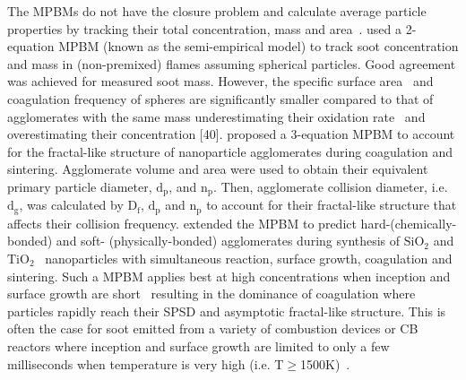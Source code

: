 The MPBMs do not have the closure problem and calculate average particle properties by tracking their total concentration, mass \citep{kruis1993simple} and area~\citep{tsantilis2004soft, lindstedt1994simplified}. \citet{kruis1993simple} used a 2-equation MPBM (known as the semi-empirical model) to track soot concentration and mass in (non-premixed) flames assuming spherical particles. Good agreement was achieved for measured soot mass. However, the specific surface area~\citep{lindstedt1994simplified} and coagulation frequency of spheres are significantly smaller compared to that of agglomerates with the same mass underestimating their oxidation rate~\citep{kelesidis2019estimating} and overestimating their concentration [40]. \citet{kruis1993simple} proposed a 3-equation MPBM to account for the fractal-like structure of nanoparticle agglomerates during coagulation and sintering. Agglomerate volume and area were used to obtain their equivalent primary particle diameter, $\mathrm{d_p}$, and $\mathrm{n_p}$. Then, agglomerate collision diameter, i.e. $\mathrm{d_g}$, was calculated by $\mathrm{D_f}$, $\mathrm{d_p}$ and $\mathrm{n_p}$ to account for their fractal-like structure that affects their collision frequency. \citet{tsantilis2004soft} extended the MPBM to predict hard-(chemically-bonded) and soft- (physically-bonded) agglomerates during synthesis of $\mathrm{SiO_2}$ and $\mathrm{TiO_2}$~\citep{grass2006design} nanoparticles with simultaneous reaction, surface growth, coagulation and sintering. Such a MPBM applies best at high concentrations when inception and surface growth are short~\citep{Spicer2002} resulting in the dominance of coagulation where particles rapidly reach their SPSD and asymptotic fractal-like structure. This is often the case for soot emitted from a variety of combustion devices or CB reactors where inception and surface growth are limited to only a few milliseconds when temperature is very high (i.e. T$\ge$1500K)~\citep{kholghy2018reactive}.

